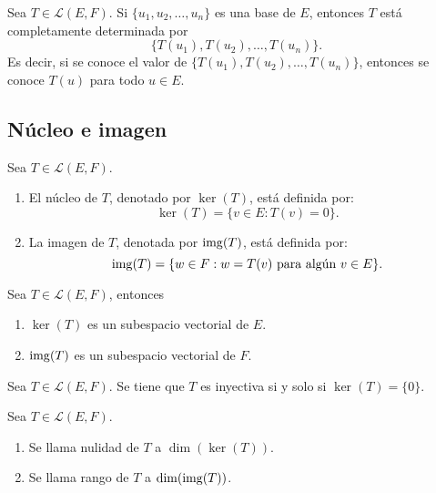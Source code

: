\documentclass[a4,11pt]{aleph-notas}
\begin{document}
\begin{teo}
    Sea $T \in \mathcal{L}(E,F)$. Si $\{u_1,u_2,\ldots,u_n\}$ es una base de $E$, entonces $T$ está completamente determinada por
    \[
        \{T(u_1),T(u_2),\ldots,T(u_n)\}.
    \]
    Es decir, si se conoce el valor de $\{T(u_1),T(u_2),\ldots,T(u_n)\}$, entonces se conoce $T(u)$ para todo $u\in E$.
\end{teo}


\subsection{Núcleo e imagen}

\begin{defi}
    Sea $T \in \mathcal{L}(E,F)$.
    \begin{enumerate}
    \item 
        El núcleo de $T$, denotado por $\ker(T)$, está definida por:
        \[
            \ker(T) = \{v \in E: T(v) = 0\}.
        \]
    \item 
        La imagen de $T$, denotada por $\operatorname{img}(T)$, está definida por:
        \[
            \operatorname{img}(T) = \{ w \in F: w = T(v) \text{ para algún } v \in E\}.
        \]
    \end{enumerate}
\end{defi}

\begin{teo}
    Sea $T \in \mathcal{L}(E,F)$, entonces
    \begin{enumerate}
    \item 
        $\ker(T)$ es un subespacio vectorial de $E$.
    \item 
        $\operatorname{img}(T)$ es un subespacio vectorial de $F$.
    \end{enumerate}
\end{teo}
    
\begin{teo}
    Sea $T \in \mathcal{L}(E,F)$. Se tiene que $T$ es inyectiva si y solo si $\ker(T)=\{0\}$.
\end{teo}

\begin{defi}
    Sea $T \in \mathcal{L}(E,F)$.
    \begin{enumerate}
    \item 
        Se llama nulidad de $T$ a $\dim(\ker(T))$.
    \item 
        Se llama rango de $T$ a $\dim(\operatorname{img}(T))$.
    \end{enumerate}
\end{defi}
\end{document}
